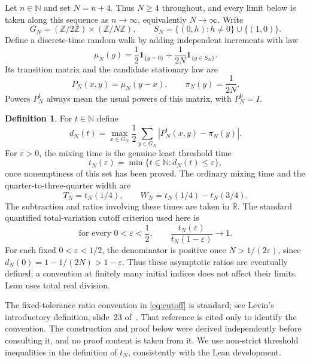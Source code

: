 \documentclass[11pt,a4paper]{article}
\theoremstyle{definition}
\newtheorem{definition}[theorem]{Definition}
\theoremstyle{remark}
\newcommand{\R}{\mathbb R}
\newcommand{\N}{\mathbb N}
\newcommand{\Z}{\mathbb Z}
\newcommand{\ind}{\mathbf 1}
\begin{document}
Let $n\in\N$ and set $N=n+4$. Thus $N\ge4$ throughout, and every limit below
is taken along this sequence as $n\to\infty$, equivalently $N\to\infty$.
Write
\[
G_N=(\Z/2\Z)\times(\Z/N\Z),\qquad
S_N=\{(0,h):h\ne0\}\cup\{(1,0)\}.
\]
Define a discrete-time random walk by adding independent increments with law
\begin{equation}\label{eq:jump}
\mu_N(g)=\frac12\ind_{\{g=0\}}
        +\frac1{2N}\ind_{\{g\in S_N\}}.
\end{equation}
Its transition matrix and the candidate stationary law are
\begin{equation}\label{eq:kernel}
P_N(x,y)=\mu_N(y-x),\qquad \pi_N(y)=\frac1{2N}.
\end{equation}
Powers $P_N^t$ always mean the usual powers of this matrix, with $P_N^0=I$.

\begin{definition}\label{def:mixing}
For $t\in\N$ define
\[
d_N(t)=\max_{x\in G_N}\frac12\sum_{y\in G_N}
          \left|P_N^t(x,y)-\pi_N(y)\right|.
\]
For $\varepsilon>0$, the mixing time is the genuine least threshold time
\[
t_N(\varepsilon)=\min\{t\in\N:d_N(t)\le\varepsilon\},
\]
once nonemptiness of this set has been proved. The ordinary mixing time and
the quarter-to-three-quarter width are
\[
T_N=t_N(1/4),\qquad W_N=t_N(1/4)-t_N(3/4).
\]
The subtraction and ratios involving these times are taken in $\R$.
The standard quantified total-variation cutoff criterion used here is
\begin{equation}\label{eq:cutoff}
\text{for every }0<\varepsilon<\frac12,\qquad
\frac{t_N(\varepsilon)}{t_N(1-\varepsilon)}\longrightarrow1.
\end{equation}
For each fixed $0<\varepsilon<1/2$, the denominator is positive once
$N>1/(2\varepsilon)$, since $d_N(0)=1-1/(2N)>1-\varepsilon$.
Thus these asymptotic ratios are eventually defined; a convention at finitely
many initial indices does not affect their limits. Lean uses total real division.
\end{definition}

The fixed-tolerance ratio convention in \eqref{eq:cutoff} is standard; see
Levin's introductory definition, slide~23 of~\cite{levin}. That reference is
cited only to identify the convention. The construction and proof below
were derived independently before consulting it, and no proof content is
taken from it. We use non-strict threshold inequalities in the definition
of $t_N$, consistently with the Lean development.
\end{document}
